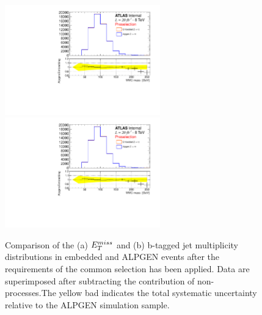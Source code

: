 \begin{figure}[tp]
     \begin{center}

           \includegraphics[page=2, width=0.6\textwidth]{figure/bg_estimation/std_plots_emb.pdf}
            \includegraphics[page=3, width=0.6\textwidth]{figure/bg_estimation/std_plots_emb.pdf}

    \end{center}
    \caption{Comparison of the (a)  $E_{T}^{miss}$  and (b) b-tagged jet multiplicity distributions in
	embedded and ALPGEN \Ztautau events after the requirements of the common selection has been applied.
	Data are superimposed after subtracting  the contribution of non-\Ztautau processes.The yellow bad indicates
	 the total systematic uncertainty  relative to the ALPGEN simulation sample.}
   \label{fig:emb_vs_alp}
\end{figure}



